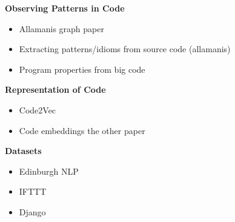 \textbf{Observing Patterns in Code}
\begin{itemize}
    \item Allamanis graph paper
    \item Extracting patterns/idioms from source code (allamanis)
    \item Program properties from big code
\end{itemize}

\textbf{Representation of Code}
\begin{itemize}
    \item Code2Vec
    \item Code embeddings the other paper
\end{itemize}

\textbf{Datasets}
\begin{itemize}
    \item Edinburgh NLP
    \item IFTTT
    \item Django 
\end{itemize}







